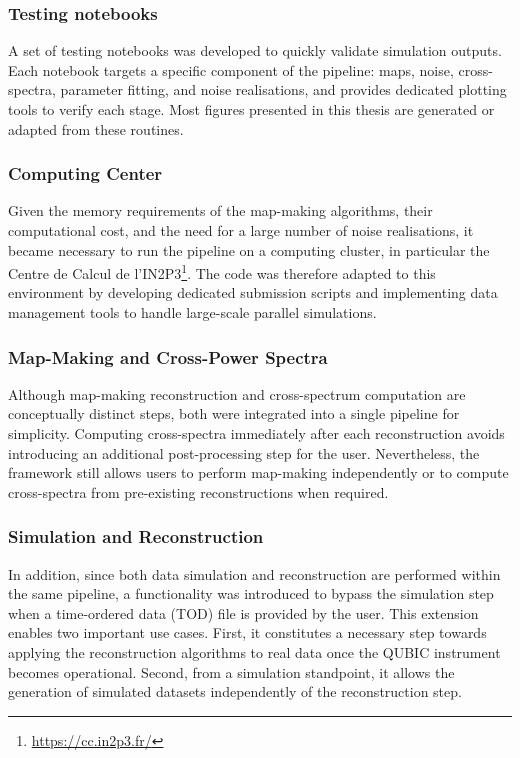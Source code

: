 \documentclass[../../thesis.tex]{subfiles}
\begin{document}
\subsubsection{Testing notebooks}

A set of testing notebooks was developed to quickly validate simulation outputs. Each notebook targets a specific component of the pipeline: maps, noise, cross-spectra, parameter fitting, and noise realisations, and provides dedicated plotting tools to verify each stage. Most figures presented in this thesis are generated or adapted from these routines.

\subsubsection{Computing Center}

Given the memory requirements of the map-making algorithms, their computational cost, and the need for a large number of noise realisations, it became necessary to run the pipeline on a computing cluster, in particular the Centre de Calcul de l'IN2P3\footnote{\url{https://cc.in2p3.fr/}}. The code was therefore adapted to this environment by developing dedicated submission scripts and implementing data management tools to handle large-scale parallel simulations.

\subsubsection{Map-Making and Cross-Power Spectra}

Although map-making reconstruction and cross-spectrum computation are conceptually distinct steps, both were integrated into a single pipeline for simplicity. Computing cross-spectra immediately after each reconstruction avoids introducing an additional post-processing step for the user. Nevertheless, the framework still allows users to perform map-making independently or to compute cross-spectra from pre-existing reconstructions when required.

\subsubsection{Simulation and Reconstruction}

In addition, since both data simulation and reconstruction are performed within the same pipeline, a functionality was introduced to bypass the simulation step when a time-ordered data (TOD) file is provided by the user. This extension enables two important use cases. First, it constitutes a necessary step towards applying the reconstruction algorithms to real data once the QUBIC instrument becomes operational. Second, from a simulation standpoint, it allows the generation of simulated datasets independently of the reconstruction step.
\end{document}
